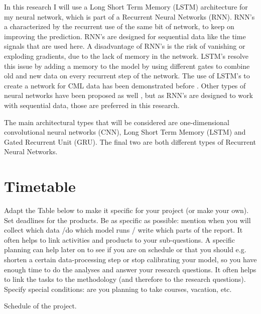 \documentclass[twocolumn, 10pt, a4paper]{article}
\begin{document}
	In this research I will use a Long Short Term Memory (LSTM) architecture for my neural network, which is part of a Recurrent Neural Networks (RNN). RNN's a characterized by the recurrent use of the same bit of network, to keep on improving the prediction. RNN's are designed for sequential data like the time signals that are used here. A disadvantage of RNN's is the risk of vanishing or exploding gradients, due to the lack of memory in the network. LSTM's resolve this issue by adding a memory to the model by using different gates to combine old and new data on every recurrent step of the network. The use of LSTM's to create a network for CML data has been demonstrated before \cite{Habi2019, Diba2021, Pudashine2020}. Other types of neural networks have been proposed as well \cite{Polz2020}, but as RNN's are designed to work with sequential data, those are preferred in this research.
	
	The main architectural types that will be considered are one-dimensional convolutional neural networks (CNN), Long Short Term Memory (LSTM) and Gated Recurrent Unit (GRU). The final two are both different types of Recurrent Neural Networks. 
	
	
	\section{Timetable}
	
	Adapt the Table below to make it specific for your project (or make your own). Set deadlines for the products. Be as specific as possible: mention when you will collect which data /do which model runs / write which parts of the report. It often helps to link activities and products to your sub-questions. A specific planning can help later on to see if you are on schedule or that you should e.g. shorten a certain data-processing step or stop calibrating your model, so you have enough time to do the analyses and answer your research questions. It often helps to link the tasks to the methodology (and therefore to the research questions). Specify special conditions: are you planning to take courses, vacation, etc. 
	
	
	\begin{table*}[t]
		\caption{Schedule of the project.}
		\label{tab:schedule}
	\end{table*}
	
\end{document}
